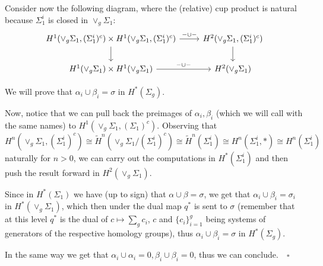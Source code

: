 \documentclass{article}
\begin{document}
Consider now the following diagram, where the (relative) cup product is natural
because $\Sigma^i_1$ is closed in $\vee_g\Sigma_1$:
\[
    \begin{tikzcd}
        H^1(\vee_g\Sigma_1,(\Sigma^i_1)^c)\times
        H^1(\vee_g\Sigma_1,(\Sigma^i_1)^c)\arrow{d}\arrow{r}{-\cup-}
        & H^2(\vee_g\Sigma_1,(\Sigma^i_1)^c)\arrow{d} \\
        H^1(\vee_g\Sigma_1)\times H^1(\vee_g\Sigma_1)\arrow{r}{-\cup-}
        & H^2(\vee_g\Sigma_1)
    \end{tikzcd}
\]

We will prove that $\alpha_i\cup\beta_i=\sigma$ in $H^*(\Sigma_g)$.

Now, notice that we can pull back the preimages of $\alpha_i,\beta_i$ (which we
will call with the same names) to $H^1(\vee_g\Sigma_1,(\Sigma_1)^c)$. Observing
that $H^n(\vee_g\Sigma_1,(\Sigma^i_1)^c)\cong
\tilde{H}^n(\vee_g\Sigma_1/(\Sigma^i_1)^c)\cong\tilde{H}^n(\Sigma^i_1)\cong
H^n(\Sigma^i_1,*)\cong H^n(\Sigma^i_1)$ naturally for $n>0$, we can carry out
the computations in $H^*(\Sigma^i_1)$ and then push the result forward in
$H^2(\vee_g\Sigma_1)$.

Since in $H^*(\Sigma_1)$ we have (up to sign) that $\alpha\cup\beta=\sigma$, we get that
$\alpha_i\cup\beta_i=\sigma_i$ in $H^*(\vee_g\Sigma_1)$, which then under the
dual map $q^*$ is sent to $\sigma$ (remember that at this level $q^*$ is the
dual of $c\mapsto\sum_g c_i$, $c$ and
$\{c_i\}_{i=1}^g$ being systems of generators of the respective homology groups),
thus $\alpha_i\cup\beta_i=\sigma$ in $H^*(\Sigma_g)$.

In the same way we get that $\alpha_i\cup\alpha_i=0,\beta_i\cup\beta_i=0$,
thus we can conclude.$\quad\square$

\printbibliography
\end{document}
